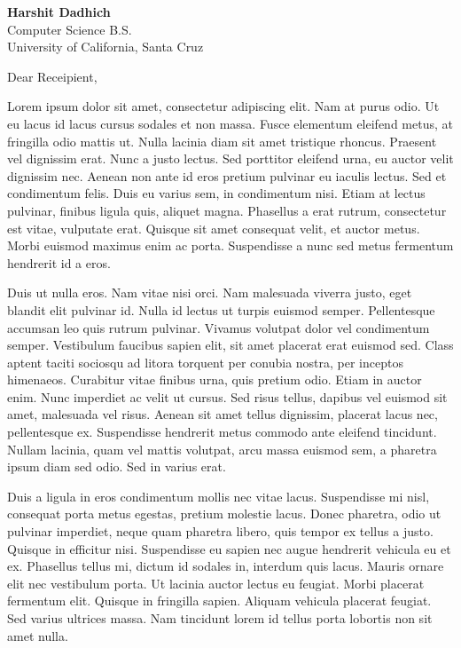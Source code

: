 \documentclass[11pt]{cicsletter}
\date{\today}
\begin{document}
\begin{letter}{
        {\textbf{Harshit Dadhich}}\hfill \href{https://harshdadhich.com}{\color[HTML]{0000EE}{harshdadhich.com}}~\faGlobe\\
        Computer Science B.S.\hfill \href{mailto:hdadhich01@gmail.com}{\color[HTML]{0000EE}{hdadhich01@gmail.com}}~\faEnvelope\\
        University of California, Santa Cruz\hfill \href{tel:+12096371007}{\color[HTML]{0000EE}{+1 (209) 637-1007}}~\faPhone\\
    }
    \opening{Dear Receipient,}

    Lorem ipsum dolor sit amet, consectetur adipiscing elit. Nam at purus odio. Ut eu lacus id lacus cursus sodales et non massa. Fusce elementum eleifend metus, at fringilla odio mattis ut. Nulla lacinia diam sit amet tristique rhoncus. Praesent vel dignissim erat. Nunc a justo lectus. Sed porttitor eleifend urna, eu auctor velit dignissim nec. Aenean non ante id eros pretium pulvinar eu iaculis lectus. Sed et condimentum felis. Duis eu varius sem, in condimentum nisi. Etiam at lectus pulvinar, finibus ligula quis, aliquet magna. Phasellus a erat rutrum, consectetur est vitae, vulputate erat. Quisque sit amet consequat velit, et auctor metus. Morbi euismod maximus enim ac porta. Suspendisse a nunc sed metus fermentum hendrerit id a eros.

    Duis ut nulla eros. Nam vitae nisi orci. Nam malesuada viverra justo, eget blandit elit pulvinar id. Nulla id lectus ut turpis euismod semper. Pellentesque accumsan leo quis rutrum pulvinar. Vivamus volutpat dolor vel condimentum semper. Vestibulum faucibus sapien elit, sit amet placerat erat euismod sed. Class aptent taciti sociosqu ad litora torquent per conubia nostra, per inceptos himenaeos. Curabitur vitae finibus urna, quis pretium odio. Etiam in auctor enim. Nunc imperdiet ac velit ut cursus. Sed risus tellus, dapibus vel euismod sit amet, malesuada vel risus. Aenean sit amet tellus dignissim, placerat lacus nec, pellentesque ex. Suspendisse hendrerit metus commodo ante eleifend tincidunt. Nullam lacinia, quam vel mattis volutpat, arcu massa euismod sem, a pharetra ipsum diam sed odio. Sed in varius erat.

    Duis a ligula in eros condimentum mollis nec vitae lacus. Suspendisse mi nisl, consequat porta metus egestas, pretium molestie lacus. Donec pharetra, odio ut pulvinar imperdiet, neque quam pharetra libero, quis tempor ex tellus a justo. Quisque in efficitur nisi. Suspendisse eu sapien nec augue hendrerit vehicula eu et ex. Phasellus tellus mi, dictum id sodales in, interdum quis lacus. Mauris ornare elit nec vestibulum porta. Ut lacinia auctor lectus eu feugiat. Morbi placerat fermentum elit. Quisque in fringilla sapien. Aliquam vehicula placerat feugiat. Sed varius ultrices massa. Nam tincidunt lorem id tellus porta lobortis non sit amet nulla.


\end{letter}
\end{document}
